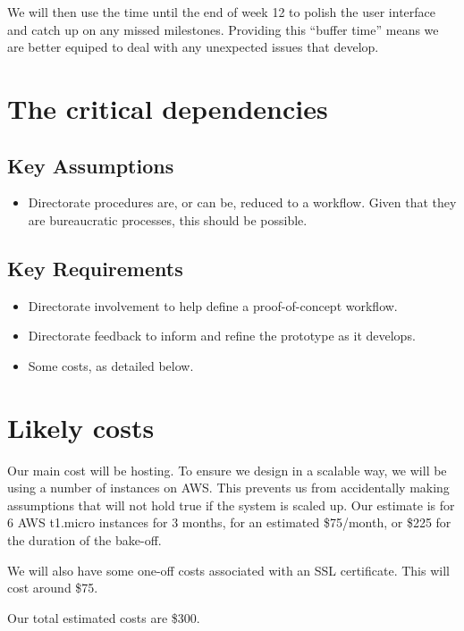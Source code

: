 \documentclass[12pt]{article}
\begin{document}
We will then use the time until the end of week 12 to polish the user
interface and catch up on any missed milestones. Providing this ``buffer
time'' means we are better equiped to deal with any unexpected issues
that develop.

\section{The critical dependencies}

\subsection{Key Assumptions}

\begin{itemize}
\item
  Directorate procedures are, or can be, reduced to a workflow. Given
  that they are bureaucratic processes, this should be possible.
\end{itemize}

\subsection{Key Requirements}

\begin{itemize}
\item
  Directorate involvement to help define a proof-of-concept workflow.
\item
  Directorate feedback to inform and refine the prototype as it
  develops.
\item
  Some costs, as detailed below.
\end{itemize}

\section{Likely costs}

Our main cost will be hosting. To ensure we design in a scalable way, we
will be using a number of instances on AWS. This prevents us from
accidentally making assumptions that will not hold true if the system is
scaled up. Our estimate is for 6 AWS t1.micro instances for 3 months,
for an estimated \$75/month, or \$225 for the duration of the bake-off.

We will also have some one-off costs associated with an SSL certificate.
This will cost around \$75.

Our total estimated costs are \$300.
\end{document}
